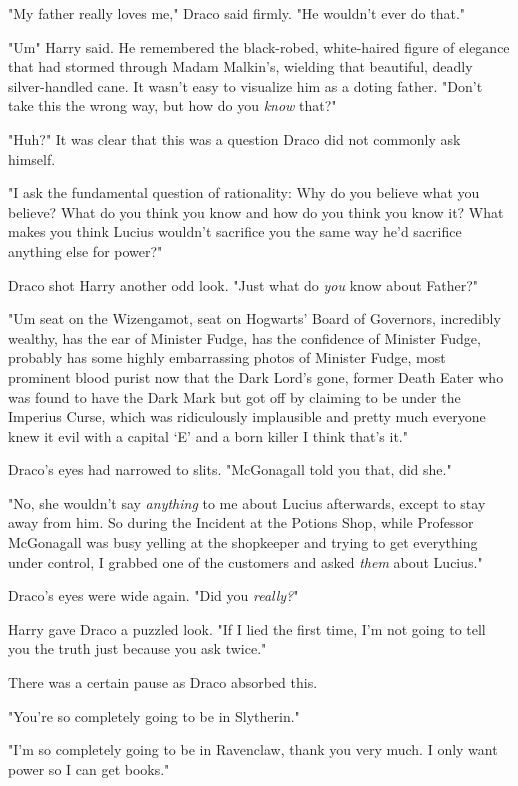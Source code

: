 "My father really loves me," Draco said firmly. "He wouldn't ever do that."

"Um{\el}" Harry said. He remembered the black-robed, white-haired figure of
elegance that had stormed through Madam Malkin's, wielding that beautiful,
deadly silver-handled cane. It wasn't easy to visualize him as a doting father.
"Don't take this the wrong way, but how do you \emph{know} that?"

"Huh?" It was clear that this was a question Draco did not commonly ask himself.

"I ask the fundamental question of rationality: Why do you believe what you
believe? What do you think you know and how do you think you know it? What
makes you think Lucius wouldn't sacrifice you the same way he'd sacrifice
anything else for power?"

Draco shot Harry another odd look. "Just what do \emph{you} know about Father?"

"Um{\el} seat on the Wizengamot, seat on Hogwarts' Board of Governors,
incredibly wealthy, has the ear of Minister Fudge, has the confidence of
Minister Fudge, probably has some highly embarrassing photos of Minister Fudge,
most prominent blood purist now that the Dark Lord's gone, former Death Eater
who was found to have the Dark Mark but got off by claiming to be under the
Imperius Curse, which was ridiculously implausible and pretty much everyone
knew it{\el} evil with a capital `E' and a born killer{\el} I think
that's it."

Draco's eyes had narrowed to slits. "McGonagall told you that, did she."

"No, she wouldn't say \emph{anything} to me about Lucius afterwards, except to
stay away from him. So during the Incident at the Potions Shop, while Professor
McGonagall was busy yelling at the shopkeeper and trying to get everything
under control, I grabbed one of the customers and asked \emph{them} about
Lucius."

Draco's eyes were wide again. "Did you \emph{really?}"

Harry gave Draco a puzzled look. "If I lied the first time, I'm not going to
tell you the truth just because you ask twice."

There was a certain pause as Draco absorbed this.

"You're so completely going to be in Slytherin."

"I'm so completely going to be in Ravenclaw, thank you very much. I only want
power so I can get books."

